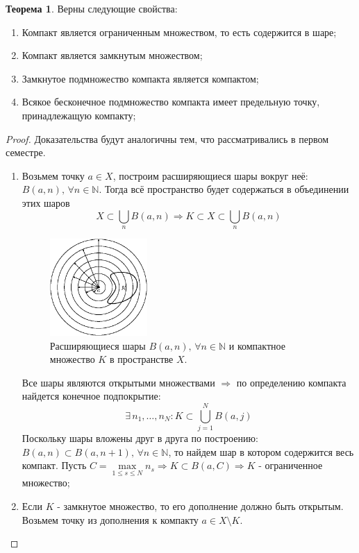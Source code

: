 \documentclass[12pt]{article}
\newcommand{\MN}{\mathbb{N}}
\theoremstyle{definition}
\newtheorem{theorem}{Теорема}
\begin{document}
\begin{theorem}
	Верны следующие свойства:
	\begin{enumerate}[label ={(\arabic*)}]
		\item Компакт является ограниченным множеством, то есть содержится в шаре; 
		\item Компакт является замкнутым множеством;
		\item Замкнутое подмножество компакта является компактом;
		\item Всякое бесконечное подмножество компакта имеет предельную точку, принадлежащую компакту;
	\end{enumerate}
\end{theorem}
\begin{proof}Доказательства будут аналогичны тем, что рассматривались в первом семестре.
	\begin{enumerate}[label ={(\arabic*)}]
		\item Возьмем точку $a \in X$, построим расширяющиеся шары вокруг неё: $B(a,n), \, \forall n \in \MN$. Тогда всё пространство будет содержаться в объединении этих шаров 
		$$
			X \subset \textstyle \bigcup\limits_n B(a,n) \Rightarrow K \subset X \subset \textstyle \bigcup\limits_n B(a,n)
		$$
		\begin{figure}[H]
			\centering
			\includegraphics[width=0.35\textwidth]{8_5.eps}
			\caption{Расширяющиеся шары $B(a,n), \, \forall n \in \MN$ и компактное множество $K$ в пространстве $X$.}
			\label{8_5}
		\end{figure}
		Все шары являются открытыми множествами $\Rightarrow$ по определению компакта найдется конечное подпокрытие:
		$$
			\exists \, n_1, \dotsc, n_N \colon K \subset\textstyle \bigcup\limits_{j = 1}^{N} B(a,j)
		$$
		Поскольку шары вложены друг в друга по построению: $B(a,n) \subset B(a,n+1), \, \forall n \in \MN$, то найдем шар в котором содержится весь компакт. Пусть $C = \max\limits_{1 \leq s \leq N}{n_s} \Rightarrow K \subset B(a,C) \Rightarrow K$ - ограниченное множество;		
		\item Если $K$ - замкнутое множество, то его дополнение должно быть открытым. Возьмем точку из дополнения к компакту $a \in X \setminus K$. 
		

\end{enumerate}
\end{proof}
\end{document}
